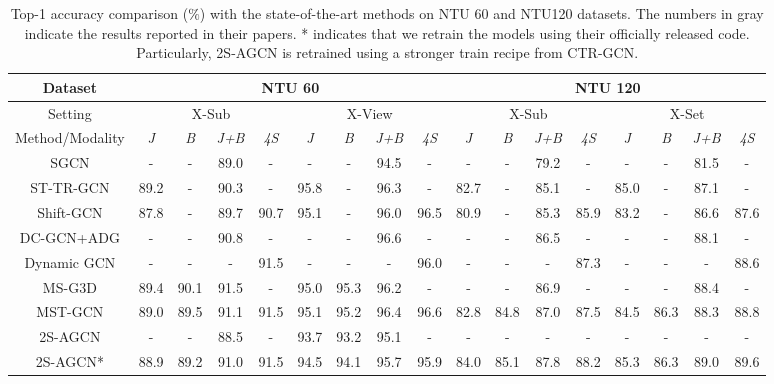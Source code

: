 \documentclass{article} \usepackage{iclr2023_conference,times}
\begin{document}
\begin{table}[t]
    \scriptsize
    \setlength\tabcolsep{2.5pt}
    \caption{Top-1 accuracy comparison ($\%$) with the state-of-the-art methods on NTU 60 and NTU120 datasets. The numbers in gray indicate the results reported in their papers. * indicates that we retrain the models using their officially released code. Particularly, 2S-AGCN is retrained using a stronger train recipe from CTR-GCN.}
    \begin{tabular}{c||c|c|c|c|c|c|c|c||c|c|c|c|c|c|c|c}
\rowcolor{gray!30} Dataset & \multicolumn{8}{c||}{NTU 60} & \multicolumn{8}{c}{NTU 120} \\\hline
       \rowcolor{gray!30} Setting & \multicolumn{4}{c|}{X-Sub} & \multicolumn{4}{c||}{X-View} & \multicolumn{4}{c|}{X-Sub} & \multicolumn{4}{c}{X-Set} \\\hline
       \rowcolor{gray!30} Method/Modality & \textit{J} & \textit{B} & \textit{J+B} & \textit{4S} & \textit{J} & \textit{B} & \textit{J+B} & \textit{4S} & \textit{J} & \textit{B} & \textit{J+B} & \textit{4S} & \textit{J} & \textit{B} & \textit{J+B} & \textit{4S} \\
       \hline \hline
       SGCN \citep{SGN} & - & - & 89.0 & - & - & - & 94.5 & - & - & - & 79.2 & - & - & - & 81.5 & - \\
       ST-TR-GCN \citep{sttragcn} & 89.2 & - & 90.3 & - & 95.8 & - & 96.3 & - & 82.7 & - & 85.1 & - & 85.0 & - & 87.1 & - \\
       Shift-GCN \citep{shiftgcn} & 87.8 & - & 89.7 & 90.7 & 95.1 & - & 96.0 & 96.5 & 80.9 & - & 85.3 & 85.9 & 83.2 & - & 86.6 & 87.6 \\
       DC-GCN+ADG \citep{decouplinggcn} & - & - & 90.8 & - & - & - & 96.6 & - & - & - & 86.5 & - & - & - & 88.1 & - \\
       Dynamic GCN \citep{DynamicGCN} & - & - & - & 91.5 & - & - & - & 96.0 & - & - & - & 87.3 & - & - & - & 88.6 \\
       MS-G3D \citep{MSG3D} & 89.4 & 90.1 & 91.5 & - & 95.0 & 95.3 & 96.2 & - & - & - & 86.9 & - & - & - & 88.4 & - \\ 
       MST-GCN \citep{MSGCN} & 89.0 & 89.5 & 91.1 & 91.5 & 95.1 & 95.2 & 96.4 & 96.6 & 82.8 & 84.8 & 87.0 & 87.5 & 84.5 & 86.3 & 88.3 & 88.8 \\\hline \hline
       {\color{gray}2S-AGCN \citep{2SAGCN}} & - & - & {\color{gray}88.5} & - & {\color{gray}93.7} & {\color{gray}93.2} & {\color{gray}95.1} & - & - & - & - & - & - & - & - & - \\
       2S-AGCN* \citep{2SAGCN} & 88.9 & 89.2 & 91.0 & 91.5 & 94.5 & 94.1 & 95.7 & 95.9 & 84.0 & 85.1 & 87.8 & 88.2 & 85.3 & 86.3 & 89.0 & 89.6 \\

\end{tabular}
\end{table}
\end{document}
